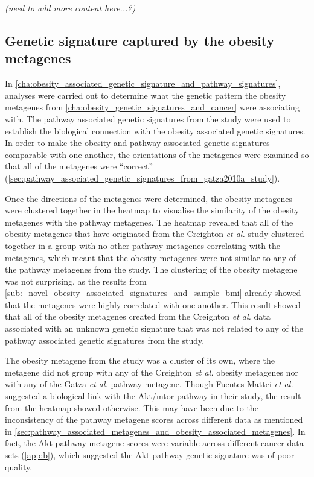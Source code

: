 \textit{(need to add more content here...?)}

\subsection{Genetic signature captured by the obesity metagenes}
\label{sub:genetic_signature_captured_by_the_obesity_metagenes}

In \cref{cha:obesity_associated_genetic_signature_and_pathway_signatures}, analyses were carried out to determine what the genetic pattern the obesity metagenes from \cref{cha:obesity_genetic_signatures_and_cancer} were associating with.
The pathway associated genetic signatures from the \citet{Gatza2010a} study were used to establish the biological connection with the obesity associated genetic signatures.
In order to make the obesity and pathway associated genetic signatures comparable with one another, the orientations of the metagenes were examined so that all of the metagenes were ``correct'' (\cref{sec:pathway_associated_genetic_signatures_from_gatza2010a_study}).

Once the directions of the metagenes were determined, the obesity metagenes were clustered together in the heatmap to visualise the similarity of the obesity metagenes with the pathway metagenes.
The heatmap revealed that all of the obesity metagenes that have originated from the Creighton \textit{et al.} study clustered together in a group with no other pathway metagenes correlating with the metagenes, which meant that the obesity metagenes were not similar to any of the pathway metagenes from the \citet{Gatza2010a} study.
The clustering of the obesity metagene was not surprising, as the results from \cref{sub:_novel_obesity_associated_signatures_and_sample_bmi} already showed that the metagenes were highly correlated with one another.
This result showed that all of the obesity metagenes created from the Creighton \textit{et al.} data associated with an unknown genetic signature that was not related to any of the pathway associated genetic signatures from the \citet{Gatza2010a} study.

The obesity metagene from the \citet{Fuentes-Mattei2014} study was a cluster of its own, where the metagene did not group with any of the Creighton \textit{et al.} obesity metagenes nor with any of the Gatza \textit{et al.} pathway metagene.
Though Fuentes-Mattei \textit{et al.} suggested a biological link with the Akt/\gls{mtor} pathway in their study, the result from the heatmap showed otherwise.
This may have been due to the inconsistency of the pathway metagene scores across different data as mentioned in \cref{sec:pathway_associated_metagenes_and_obesity_associated_metagenes}.
In fact, the Akt pathway metagene scores were variable across different cancer data sets (\cref{app:b}), which suggested the Akt pathway genetic signature was of poor quality.

